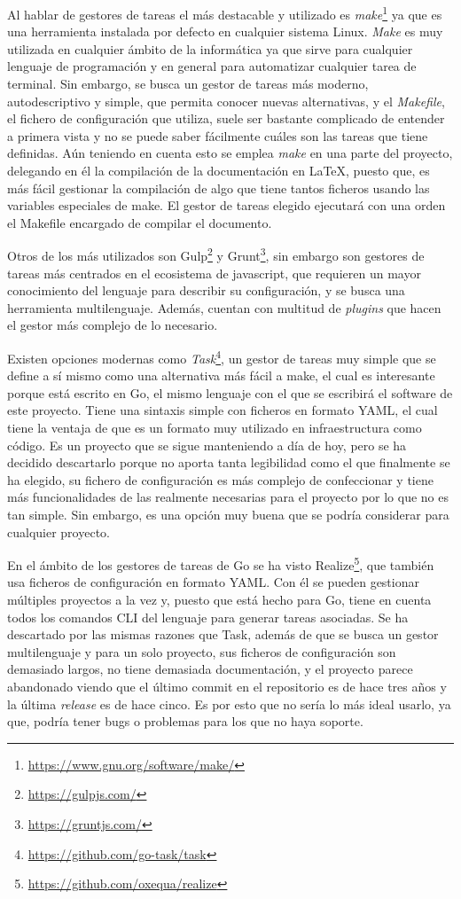 Al hablar de gestores de tareas el más destacable y utilizado es
\textit{make}\footnote{\url{https://www.gnu.org/software/make/}} ya que es una
herramienta instalada por defecto en cualquier sistema Linux. \textit{Make} es
muy utilizada en cualquier ámbito de la informática ya que sirve para cualquier
lenguaje de programación y en general para automatizar cualquier tarea de
terminal. Sin embargo, se busca un gestor de tareas más moderno, autodescriptivo
y simple, que permita conocer nuevas alternativas, y el \textit{Makefile}, el
fichero de configuración que utiliza, suele ser bastante complicado de entender
a primera vista y no se puede saber fácilmente cuáles son las tareas que tiene
definidas. Aún teniendo en cuenta esto se emplea \textit{make} en una parte del
proyecto, delegando en él la compilación de la documentación en LaTeX, puesto
que, es más fácil gestionar la compilación de algo que tiene tantos ficheros
usando las variables especiales de make. El gestor de tareas elegido ejecutará
con una orden el Makefile encargado de compilar el documento.

Otros de los más utilizados son Gulp\footnote{\url{https://gulpjs.com/}} y
Grunt\footnote{\url{https://gruntjs.com/}}, sin embargo son gestores de tareas
más centrados en el ecosistema de javascript, que requieren un mayor
conocimiento del lenguaje para describir su configuración, y se busca una
herramienta multilenguaje. Además, cuentan con multitud de \textit{plugins} que
hacen el gestor más complejo de lo necesario.

Existen opciones modernas como
\textit{Task}\footnote{\url{https://github.com/go-task/task}}, un gestor de
tareas muy simple que se define a sí mismo como una alternativa más fácil a
make, el cual es interesante porque está escrito en Go, el mismo lenguaje con el
que se escribirá el software de este proyecto. Tiene una sintaxis simple con
ficheros en formato YAML, el cual tiene la ventaja de que es un formato muy
utilizado en infraestructura como código. Es un proyecto que se sigue
manteniendo a día de hoy, pero se ha decidido descartarlo porque no aporta tanta
legibilidad como el que finalmente se ha elegido, su fichero de configuración es
más complejo de confeccionar y tiene más funcionalidades de las realmente
necesarias para el proyecto por lo que no es tan simple. Sin embargo, es una
opción muy buena que se podría considerar para cualquier proyecto.

En el ámbito de los gestores de tareas de Go se ha visto
Realize\footnote{\url{https://github.com/oxequa/realize}}, que también usa
ficheros de configuración en formato YAML. Con él se pueden gestionar múltiples
proyectos a la vez y, puesto que está hecho para Go, tiene en cuenta todos los
comandos CLI del lenguaje para generar tareas asociadas. Se ha descartado por
las mismas razones que Task, además de que se busca un gestor multilenguaje y
para un solo proyecto, sus ficheros de configuración son demasiado largos, no
tiene demasiada documentación, y el proyecto parece abandonado viendo que el
último commit en el repositorio es de hace tres años y la última
\textit{release} es de hace cinco. Es por esto que no sería lo más ideal usarlo,
ya que, podría tener bugs o problemas para los que no haya soporte.

